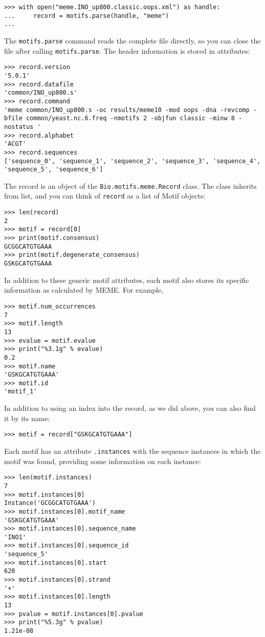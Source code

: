 \begin{verbatim}
>>> with open("meme.INO_up800.classic.oops.xml") as handle:
...     record = motifs.parse(handle, "meme")
...
\end{verbatim}
The \verb+motifs.parse+ command reads the complete file directly, so you can
close the file after calling \verb+motifs.parse+.
The header information is stored in attributes:

\begin{verbatim}
>>> record.version
'5.0.1'
>>> record.datafile
'common/INO_up800.s'
>>> record.command
'meme common/INO_up800.s -oc results/meme10 -mod oops -dna -revcomp -bfile common/yeast.nc.6.freq -nmotifs 2 -objfun classic -minw 8 -nostatus '
>>> record.alphabet
'ACGT'
>>> record.sequences
['sequence_0', 'sequence_1', 'sequence_2', 'sequence_3', 'sequence_4', 'sequence_5', 'sequence_6']
\end{verbatim}
The record is an object of the \verb+Bio.motifs.meme.Record+ class.
The class inherits from list, and you can think of \verb+record+ as a list of Motif objects:

\begin{verbatim}
>>> len(record)
2
>>> motif = record[0]
>>> print(motif.consensus)
GCGGCATGTGAAA
>>> print(motif.degenerate_consensus)
GSKGCATGTGAAA
\end{verbatim}
In addition to these generic motif attributes, each motif also stores its
specific information as calculated by MEME. For example,

\begin{verbatim}
>>> motif.num_occurrences
7
>>> motif.length
13
>>> evalue = motif.evalue
>>> print("%3.1g" % evalue)
0.2
>>> motif.name
'GSKGCATGTGAAA'
>>> motif.id
'motif_1'
\end{verbatim}
In addition to using an index into the record, as we did above,
you can also find it by its name:

\begin{verbatim}
>>> motif = record["GSKGCATGTGAAA"]
\end{verbatim}
Each motif has an attribute \verb+.instances+ with the sequence instances
in which the motif was found, providing some information on each instance:

\begin{verbatim}
>>> len(motif.instances)
7
>>> motif.instances[0]
Instance('GCGGCATGTGAAA')
>>> motif.instances[0].motif_name
'GSKGCATGTGAAA'
>>> motif.instances[0].sequence_name
'INO1'
>>> motif.instances[0].sequence_id
'sequence_5'
>>> motif.instances[0].start
620
>>> motif.instances[0].strand
'+'
>>> motif.instances[0].length
13
>>> pvalue = motif.instances[0].pvalue
>>> print("%5.3g" % pvalue)
1.21e-08
\end{verbatim}

